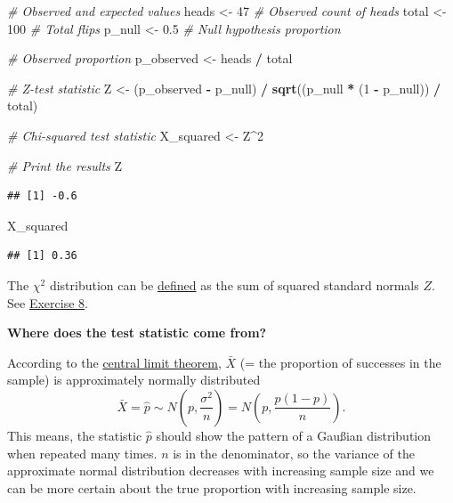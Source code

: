 \documentclass[
]{book}
\newenvironment{Shaded}{\begin{snugshade}}{\end{snugshade}}
\newcommand{\CommentTok}[1]{\textcolor[rgb]{0.56,0.35,0.01}{\textit{#1}}}
\newcommand{\DecValTok}[1]{\textcolor[rgb]{0.00,0.00,0.81}{#1}}
\newcommand{\FloatTok}[1]{\textcolor[rgb]{0.00,0.00,0.81}{#1}}
\newcommand{\FunctionTok}[1]{\textcolor[rgb]{0.13,0.29,0.53}{\textbf{#1}}}
\newcommand{\NormalTok}[1]{#1}
\newcommand{\OtherTok}[1]{\textcolor[rgb]{0.56,0.35,0.01}{#1}}
\newcommand{\SpecialCharTok}[1]{\textcolor[rgb]{0.81,0.36,0.00}{\textbf{#1}}}
\begin{document}
\begin{Shaded}
\begin{Highlighting}[]
\CommentTok{\# Observed and expected values}
\NormalTok{heads }\OtherTok{\textless{}{-}} \DecValTok{47}  \CommentTok{\# Observed count of heads}
\NormalTok{total }\OtherTok{\textless{}{-}} \DecValTok{100}  \CommentTok{\# Total flips}
\NormalTok{p\_null }\OtherTok{\textless{}{-}} \FloatTok{0.5}  \CommentTok{\# Null hypothesis proportion}

\CommentTok{\# Observed proportion}
\NormalTok{p\_observed }\OtherTok{\textless{}{-}}\NormalTok{ heads }\SpecialCharTok{/}\NormalTok{ total}

\CommentTok{\# Z{-}test statistic}
\NormalTok{Z }\OtherTok{\textless{}{-}}\NormalTok{ (p\_observed }\SpecialCharTok{{-}}\NormalTok{ p\_null) }\SpecialCharTok{/} \FunctionTok{sqrt}\NormalTok{((p\_null }\SpecialCharTok{*}\NormalTok{ (}\DecValTok{1} \SpecialCharTok{{-}}\NormalTok{ p\_null)) }\SpecialCharTok{/}\NormalTok{ total)}

\CommentTok{\# Chi{-}squared test statistic}
\NormalTok{X\_squared }\OtherTok{\textless{}{-}}\NormalTok{ Z}\SpecialCharTok{\^{}}\DecValTok{2}

\CommentTok{\# Print the results}
\NormalTok{Z}
\end{Highlighting}
\end{Shaded}

\begin{verbatim}
## [1] -0.6
\end{verbatim}

\begin{Shaded}
\begin{Highlighting}[]
\NormalTok{X\_squared}
\end{Highlighting}
\end{Shaded}

\begin{verbatim}
## [1] 0.36
\end{verbatim}

The \(\chi^2\) distribution can be \href{https://en.wikipedia.org/wiki/Chi-squared_distribution\#Definitions}{defined}
as the sum of squared standard normals \(Z\). See \hyperref[exercise8_nhst]{Exercise 8}.

\textbf{Where does the test statistic come from?}

According to the \href{https://en.wikipedia.org/wiki/Central_limit_theorem}{central limit theorem},
\(\bar{X}\) (= the proportion of successes in the sample) is approximately normally distributed\\
\[\bar{X} = \hat{p} \sim N(p, \frac{\sigma^2}{n}) = N(p, \frac{p(1-p)}{n}).\]
This means, the statistic \(\hat{p}\) should show the pattern of a Gaußian distribution when repeated many times.
\(n\) is in the denominator, so the variance of the approximate normal distribution decreases with increasing sample size and we
can be more certain about the true proportion with increasing sample size.
\end{document}
